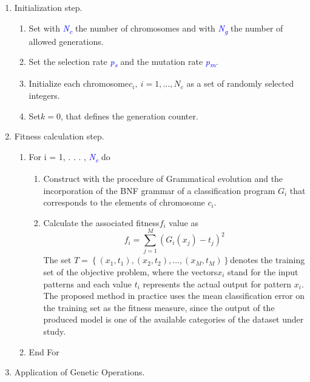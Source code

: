 \documentclass[12pt]{Definitions/academia}
\begin{document}
\begin{enumerate}
\item Initialization step.
\begin{enumerate}
\item Set with \textit{\textcolor{blue}{N\textsubscript{c}}} the number
of chromosomes and with \textit{\textcolor{blue}{N\textsubscript{g}}}
the number of allowed generations.
\item Set the selection rate \textit{\textcolor{blue}{p\textsubscript{s}
}}and the mutation rate \textit{\textcolor{blue}{p\textsubscript{m}.}}
\item Initialize each chromosome$c_{i},\ i=1,\ldots,N_{c}$ as a set of
randomly selected integers.
\item Set$k=0$, that defines the generation counter.
\end{enumerate}
\vspace{2em}
\item Fitness calculation step.
\begin{enumerate}
\item For i = 1, . . . , \textit{\textcolor{blue}{N\textsubscript{c}}}
do
\vspace{2em}
\begin{enumerate}
\item Construct with the procedure of Grammatical evolution and the incorporation
of the BNF grammar of  a classification
program $G_{i}$ that corresponds to the elements of chromosome $c_{i}$.
\item Calculate the associated fitness$f_{i}$ value as
\begin{equation}
f_{i}=\sum_{j=1}^{M}\left(G_{i}\left(x_{j}\right)-t_{j}\right)^{2}
\end{equation}
The set $T=\left\{ \left(x_{1},t_{1}\right),\left(x_{2},t_{2}\right),\ldots,\left(x_{M},t_{M}\right)\right\} $denotes
the training set of the objective problem, where the vectors$x_{i}$
stand for the input patterns and each value $t_{i}$ represents the actual
output for pattern $x_{i}$. The proposed method in practice uses
the mean classification error on the training set as the fitness measure,
since the output of the produced model is one of the available categories
of the dataset under study.
\end{enumerate}
\item End For
\end{enumerate}
\vspace{2em}
\item Application of Genetic Operations.

\end{enumerate}
\end{document}
